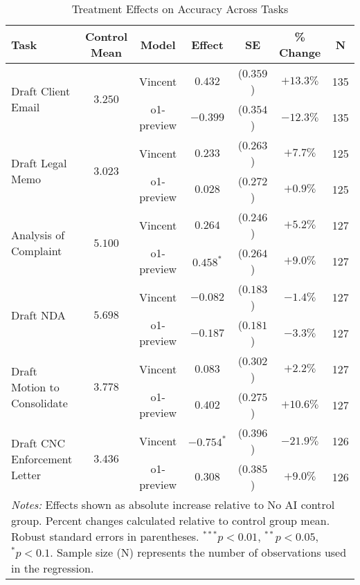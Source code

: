 \begin{table}[!htbp]
\centering
\caption{Treatment Effects on Accuracy Across Tasks}
\label{tab:accuracy_effects}
\begin{tabular}{lcccccc}
\hline\hline
Task & Control Mean & Model & Effect & SE & \% Change & N \\
\hline
\multirow{2}{*}{Draft Client Email} & \multirow{2}{*}{$3.250$} & Vincent & $0.432$ & ($0.359$) & $+13.3\%$ & 135 \\
& & o1-preview & $-0.399$ & ($0.354$) & $-12.3\%$ & 135 \\
\hline
\multirow{2}{*}{Draft Legal Memo} & \multirow{2}{*}{$3.023$} & Vincent & $0.233$ & ($0.263$) & $+7.7\%$ & 125 \\
& & o1-preview & $0.028$ & ($0.272$) & $+0.9\%$ & 125 \\
\hline
\multirow{2}{*}{Analysis of Complaint} & \multirow{2}{*}{$5.100$} & Vincent & $0.264$ & ($0.246$) & $+5.2\%$ & 127 \\
& & o1-preview & $0.458^{*}$ & ($0.264$) & $+9.0\%$ & 127 \\
\hline
\multirow{2}{*}{Draft NDA} & \multirow{2}{*}{$5.698$} & Vincent & $-0.082$ & ($0.183$) & $-1.4\%$ & 127 \\
& & o1-preview & $-0.187$ & ($0.181$) & $-3.3\%$ & 127 \\
\hline
\multirow{2}{*}{Draft Motion to Consolidate} & \multirow{2}{*}{$3.778$} & Vincent & $0.083$ & ($0.302$) & $+2.2\%$ & 127 \\
& & o1-preview & $0.402$ & ($0.275$) & $+10.6\%$ & 127 \\
\hline
\multirow{2}{*}{Draft CNC Enforcement Letter} & \multirow{2}{*}{$3.436$} & Vincent & $-0.754^{*}$ & ($0.396$) & $-21.9\%$ & 126 \\
& & o1-preview & $0.308$ & ($0.385$) & $+9.0\%$ & 126 \\
\hline
\multicolumn{7}{p{0.95\linewidth}}{\footnotesize \textit{Notes:} Effects shown as absolute increase relative to No AI control group. Percent changes calculated relative to control group mean. Robust standard errors in parentheses. $^{***}p<0.01$, $^{**}p<0.05$, $^{*}p<0.1$. Sample size (N) represents the number of observations used in the regression.}
\end{tabular}
\end{table}